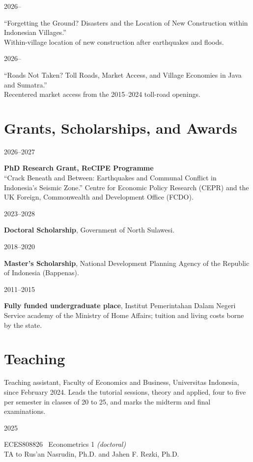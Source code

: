 \documentclass[11pt,a4paper]{article}
\newlength{\datecol}\setlength{\datecol}{0.155\textwidth}
\newlength{\bodycol}\setlength{\bodycol}{0.815\textwidth}
\newcommand{\entry}[2]{%
  \noindent
  \begin{minipage}[t]{\datecol}%
    \strut\raggedright\small\color{muted}#1%
  \end{minipage}%
  \hfill
  \begin{minipage}[t]{\bodycol}%
    \strut #2%
  \end{minipage}%
  \par\vspace{0.16em}}
\newcommand{\fentry}[1]{\noindent#1\par\vspace{0.16em}}
\newcommand{\org}[1]{{\small\color{muted}#1}}
\begin{document}
\entry{2026--}{%
  ``Forgetting the Ground? Disasters and the Location of New Construction
  within Indonesian Villages.''\\
  \org{Within-village location of new construction after earthquakes and floods.}}

\entry{2026--}{%
  ``Roads Not Taken? Toll Roads, Market Access, and Village Economies in Java
  and Sumatra.''\\
  \org{Recentered market access from the 2015--2024 toll-road openings.}}

\section{Grants, Scholarships, and Awards}

\entry{2026--2027}{%
  \textbf{PhD Research Grant, ReCIPE Programme}\\
  \org{``Crack Beneath and Between: Earthquakes and Communal Conflict in
  Indonesia's Seismic Zone.'' Centre for Economic Policy Research (CEPR) and
  the UK Foreign, Commonwealth and Development Office (FCDO).}}

\entry{2023--2028}{\textbf{Doctoral Scholarship}, Government of North Sulawesi.}

\entry{2018--2020}{\textbf{Master's Scholarship}, National Development Planning
  Agency of the Republic of Indonesia (Bappenas).}

\entry{2011--2015}{\textbf{Fully funded undergraduate place}, Institut
  Pemerintahan Dalam Negeri\\
  \org{Service academy of the Ministry of Home Affairs; tuition and living
  costs borne by the state.}}

\section{Teaching}

\fentry{Teaching assistant, Faculty of Economics and Business, Universitas
  Indonesia, since February 2024. Leads the tutorial sessions, theory and
  applied, four to five per semester in classes of 20 to 25, and marks the
  midterm and final examinations.}

\vspace{0.35em}

\entry{2025}{ECES808826 \textperiodcentered\ Econometrics 1 \emph{(doctoral)}\\
  \org{TA to Rus'an Nasrudin, Ph.D. and Jahen F. Rezki, Ph.D.}}
\end{document}
